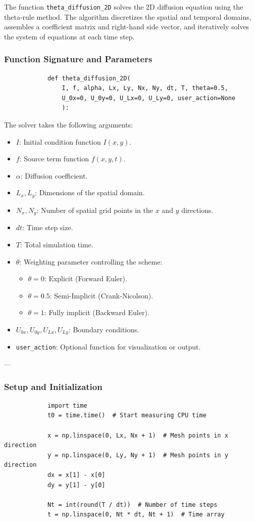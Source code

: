 \documentclass{article}
\begin{document}
		The function \texttt{theta\_diffusion\_2D} solves the 2D diffusion equation using the theta-rule method. The algorithm discretizes the spatial and temporal domains, assembles a coefficient matrix and right-hand side vector, and iteratively solves the system of equations at each time step. 
		
		\subsubsection{Function Signature and Parameters}
		\begin{lstlisting}
			def theta_diffusion_2D(
				I, f, alpha, Lx, Ly, Nx, Ny, dt, T, theta=0.5,
				U_0x=0, U_0y=0, U_Lx=0, U_Ly=0, user_action=None
				):
		\end{lstlisting}
		
		\noindent
		The solver takes the following arguments:
		\begin{itemize}
			\item $I$: Initial condition function $I(x, y)$.
			\item $f$: Source term function $f(x, y, t)$.
			\item $\alpha$: Diffusion coefficient.
			\item $L_x, L_y$: Dimensions of the spatial domain.
			\item $N_x, N_y$: Number of spatial grid points in the $x$ and $y$ directions.
			\item $dt$: Time step size.
			\item $T$: Total simulation time.
			\item $\theta$: Weighting parameter controlling the scheme:
			\begin{itemize}
				\item $\theta = 0$: Explicit (Forward Euler).
				\item $\theta = 0.5$: Semi-Implicit (Crank-Nicolson).
				\item $\theta = 1$: Fully implicit (Backward Euler).
			\end{itemize}
			\item $U_{0x}, U_{0y}, U_{Lx}, U_{Ly}$: Boundary conditions.
			\item \texttt{user\_action}: Optional function for visualization or output.
		\end{itemize}
		
		---
		
		\subsubsection{Setup and Initialization}
		\begin{lstlisting}
			import time
			t0 = time.time()  # Start measuring CPU time
			
			x = np.linspace(0, Lx, Nx + 1)  # Mesh points in x direction
			y = np.linspace(0, Ly, Ny + 1)  # Mesh points in y direction
			dx = x[1] - x[0]
			dy = y[1] - y[0]
			
			Nt = int(round(T / dt))  # Number of time steps
			t = np.linspace(0, Nt * dt, Nt + 1)  # Time array
		\end{lstlisting}
		
\end{document}
